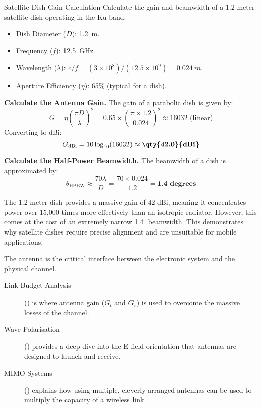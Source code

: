 \begin{workedexample}{Satellite Dish Gain Calculation}
     Calculate the gain and beamwidth of a 1.2-meter satellite dish operating in the Ku-band.
    \begin{itemize}
        \item Dish Diameter ($D$): \qty{1.2}{m}.
        \item Frequency ($f$): \qty{12.5}{GHz}.
        \item Wavelength ($\lambda$): $c/f = (3\times10^8)/(12.5\times10^9) = \qty{0.024}{m}$.
        \item Aperture Efficiency ($\eta$): 65\% (typical for a dish).
    \end{itemize}
    \begin{derivationsteps}
        \step \textbf{Calculate the Antenna Gain.} The gain of a parabolic dish is given by:
        \[ G = \eta \left(\frac{\pi D}{\lambda}\right)^2 = 0.65 \times \left(\frac{\pi \times 1.2}{0.024}\right)^2 \approx 16032 \text{ (linear)} \]
        Converting to dBi:
        \[ G_{\text{dBi}} = 10\log_{10}(16032) \approx \textbf{\qty{42.0}{dBi}} \]
        
        \step \textbf{Calculate the Half-Power Beamwidth.} The beamwidth of a dish is approximated by:
        \[ \theta_{\text{HPBW}} \approx \frac{70 \lambda}{D} = \frac{70 \times 0.024}{1.2} = \textbf{1.4 degrees} \]
    \end{derivationsteps}
     The 1.2-meter dish provides a massive gain of 42 dBi, meaning it concentrates power over 15,000 times more effectively than an isotropic radiator. However, this comes at the cost of an extremely narrow 1.4$^\circ$ beamwidth. This demonstrates why satellite dishes require precise alignment and are unsuitable for mobile applications.
\end{workedexample}


\begin{importantbox}[title={Further Reading}]
    The antenna is the critical interface between the electronic system and the physical channel.
    \begin{description}
        \item[Link Budget Analysis] () is where antenna gain ($G_t$ and $G_r$) is used to overcome the massive losses of the channel.
        \item[Wave Polarisation] () provides a deep dive into the E-field orientation that antennas are designed to launch and receive.
        \item[MIMO Systems] () explains how using multiple, cleverly arranged antennas can be used to multiply the capacity of a wireless link.
    \end{description}
\end{importantbox}
